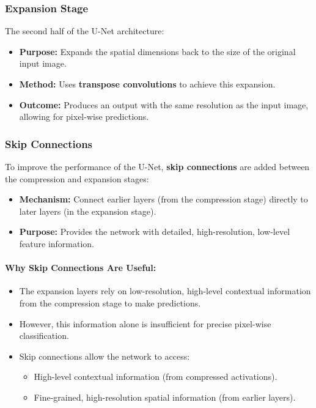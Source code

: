 \documentclass[letterpaper,12pt,notitlepage,twoside]{report}
\begin{document}
\subsubsection*{Expansion Stage}

The second half of the U-Net architecture:
\begin{itemize}
    \item \textbf{Purpose:} Expands the spatial dimensions back to the size of the original input image.
    \item \textbf{Method:} Uses \textbf{transpose convolutions} to achieve this expansion.
    \item \textbf{Outcome:} Produces an output with the same resolution as the input image, allowing for pixel-wise predictions.
\end{itemize}

\subsubsection*{Skip Connections}

To improve the performance of the U-Net, \textbf{skip connections} are added between the compression and expansion stages:
\begin{itemize}
    \item \textbf{Mechanism:} Connect earlier layers (from the compression stage) directly to later layers (in the expansion stage).
    \item \textbf{Purpose:} Provides the network with detailed, high-resolution, low-level feature information.
\end{itemize}

\paragraph{Why Skip Connections Are Useful:}
\begin{itemize}
    \item The expansion layers rely on low-resolution, high-level contextual information from the compression stage to make predictions.
    \item However, this information alone is insufficient for precise pixel-wise classification.
    \item Skip connections allow the network to access:
    \begin{itemize}
        \item High-level contextual information (from compressed activations).
        \item Fine-grained, high-resolution spatial information (from earlier layers).
    \end{itemize}
\end{itemize}
\end{document}
